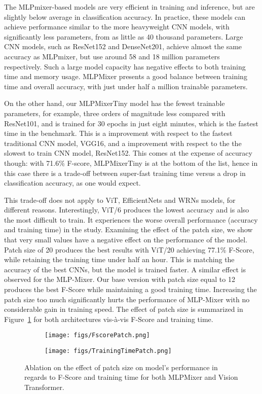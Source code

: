 \documentclass[journal]{IEEEtran}
\begin{document}
The MLPmixer-based models are very efficient in training and inference, but are slightly below average in classification accuracy. In practice, these models can achieve performance similar to the more heavyweight CNN models, with significantly less parameters, from as little as 40 thousand parameters. Large CNN models, such as ResNet152 and DenseNet201, achieve almost the same accuracy as MLPmixer, but use around 58 and 18 million parameters respectively. Such a large model capacity has negative effects to both training time and memory usage. MLPMixer presents a good balance between training time and overall accuracy, with just under half a million trainable parameters. 

On the other hand, our MLPMixerTiny model has the fewest trainable parameters, for example, three orders of magnitude less compared with ResNet101, and is trained for 30 epochs in just eight minutes, which is the fastest time in the benchmark. This is a  improvement with respect to the fastest traditional CNN model, VGG16, and a  improvement with respect to the the slowest to train CNN model, ResNet152. This comes at the expense of accuracy though: with 71.6\% F-score, MLPMixerTiny is at the bottom of the list, hence in this case there is a trade-off between super-fast training time versus a drop in classification accuracy, as one would expect. 


This trade-off does not apply to ViT, EfficientNets and WRNs models, for different reasons. Interestingly, ViT/6 produces the lowest accuracy and is also the most difficult to train. It experiences the worse overall performance (accuracy and training time) in the study. Examining the effect of the patch size, we show that very small values have a negative effect on the performance of the model. Patch size of 20 produces the best results with ViT/20 achieving 77.1\% F-Score, while retaining the training time under half an hour. This is matching the accuracy of the best CNNs, but the model is trained faster. A similar effect is observed for the MLP-Mixer. Our base version with patch size equal to 12 produces the best F-Score while maintaining a good training time. Increasing the patch size too much significantly hurts the performance of MLP-Mixer with no considerable gain in training speed. The effect of patch size is summarized in Figure~\ref{fig:patch_effect} for both architectures vis-à-vis F-Score and training time.
 
 \begin{figure}[ht]
\begin{subfigure}{0.23\textwidth}
\centering
 \texttt{[image: figs/FscorePatch.png]}
\end{subfigure}
\begin{subfigure}{0.23\textwidth}
\centering
\texttt{[image: figs/TrainingTimePatch.png]}
\end{subfigure}
\caption{Ablation on the effect of patch size on model's performance in regards to F-Score and training time for both MLPMixer and Vision Transformer.}
\label{fig:patch_effect}
\end{figure}
\end{document}
